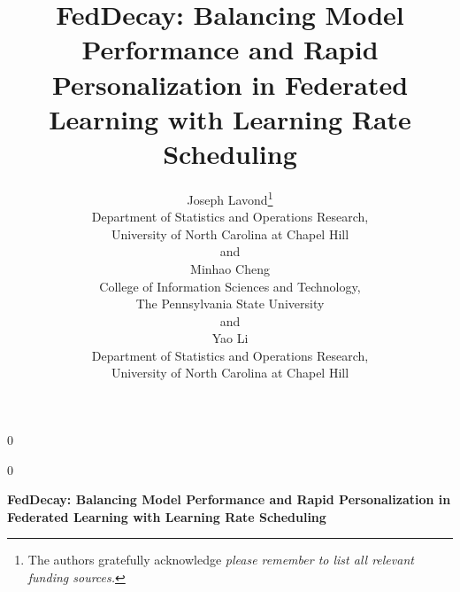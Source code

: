 \documentclass[12pt]{article}
\newcommand{\blind}{0}
\begin{document}
\def\spacingset#1{\renewcommand{\baselinestretch}%
{#1}\small\normalsize} \spacingset{1}



\blind
{
  \title{\bf FedDecay: Balancing Model Performance and Rapid Personalization in Federated Learning with Learning Rate Scheduling}
  \author{
    Joseph Lavond\thanks{The authors gratefully acknowledge \textit{please remember to list all relevant funding sources.}}\hspace{.2cm}\\
    Department of Statistics and Operations Research, \\
    University of North Carolina at Chapel Hill \\
    and \\
    Minhao Cheng \\
    College of Information Sciences and Technology, \\
    The Pennsylvania State University \\
    and \\
    Yao Li \\
    Department of Statistics and Operations Research, \\
    University of North Carolina at Chapel Hill \\
    }
  \maketitle
} \fi

\blind
{
  \bigskip
  \bigskip
  \bigskip
  \begin{center}
    {\LARGE\bf FedDecay: Balancing Model Performance and Rapid Personalization in Federated Learning with Learning Rate Scheduling}
\end{center}
  \medskip
} \fi
\end{document}
